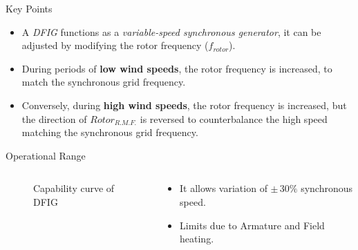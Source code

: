 \documentclass{beamer}
\begin{document}
\begin{frame}{Key Points}
\begin{itemize}
    
    \item A \textit{DFIG} functions as a \textit{variable-speed synchronous generator}, it can be adjusted by modifying the rotor frequency ($f_{\textit{rotor}}$).

    \item During periods of \textbf{low wind speeds}, the rotor frequency is increased, to match the synchronous grid frequency.

    \item Conversely, during \textbf{high wind speeds}, the rotor frequency is increased, but the direction of $Rotor_{R.M.F.}$ is reversed to counterbalance the high speed matching the synchronous grid frequency. 

\end{itemize}
\end{frame}



\begin{frame}{Operational Range}
 \begin{columns}
\begin{column}{0.5\textwidth} 
    \begin{figure}
        \centering
        \caption{Capability curve of DFIG}
    \end{figure}
    \end{column}
    
    \begin{column}{0.4\textwidth} %
      \begin{itemize}
        \item It allows variation of $\pm \,30\%$ synchronous speed.

        \item Limits due to Armature and Field heating.
    
      \end{itemize}
    \end{column}
  \end{columns}
\end{frame}
\end{document}
